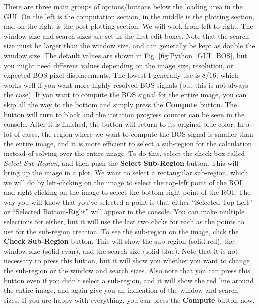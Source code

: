 \documentclass[letterpaper,12pt]{article}
\begin{document}
There are three main groups of options/buttons below the loading area in the GUI.  On the left is the computation section, in the middle is the plotting section, and on the right is the post-plotting section.  We will work from left to right.  The window size and search sizes are set in the first edit boxes.  Note that the search size must be larger than the window size, and can generally be kept as double the window size.  The default values are shown in Fig. \ref{fig:Python_GUI_BOS}, but you might need different values depending on the image size, resolution, or expected BOS pixel displacements.  The lowest I generally use is $8$/$16$, which works well if you want more highly resolved BOS signals (but this is not always the case).  If you want to compute the BOS signal for the entire image, you can skip all the way to the bottom and simply press the \textcolor{myBlue}{\textbf{Compute}} button.  The button will turn to black and the iteration progress counter can be seen in the console.  After it is finished, the button will return to its original blue color.  In a lot of cases, the region where we want to compute the BOS signal is smaller than the entire image, and it is more efficient to select a sub-region for the calculation instead of solving over the entire image.  To do this, select the check-box called \textcolor{myBlue}{\textit{Select Sub-Region}}, and then push the \textcolor{myBlue}{\textbf{Select Sub-Region}} button.  This will bring up the image in a plot.  We want to select a rectangular sub-region, which we will do by left-clicking on the image to select the top-left point of the ROI, and right-clicking on the image to select the bottom-right point of the ROI.  The way you will know that you've selected a point is that either ``Selected Top-Left'' or ``Selected Bottom-Right'' will appear in the console.  You can make multiple selections for either, but it will use the last two clicks for each as the points to use for the sub-region creation.  To see the sub-region on the image, click the \textcolor{myBlue}{\textbf{Check Sub-Region}} button.  This will show the sub-region (solid red), the window size (solid cyan), and the search size (solid blue).  Note that it is not necessary to press this button, but it will show you whether you want to change the sub-region or the window and search sizes.  Also note that you can press this button even if you didn't select a sub-region, and it will show the red line around the entire image, and again give you an indication of the window and search sizes.  If you are happy with everything, you can press the \textcolor{myBlue}{\textbf{Compute}} button now.
\end{document}
